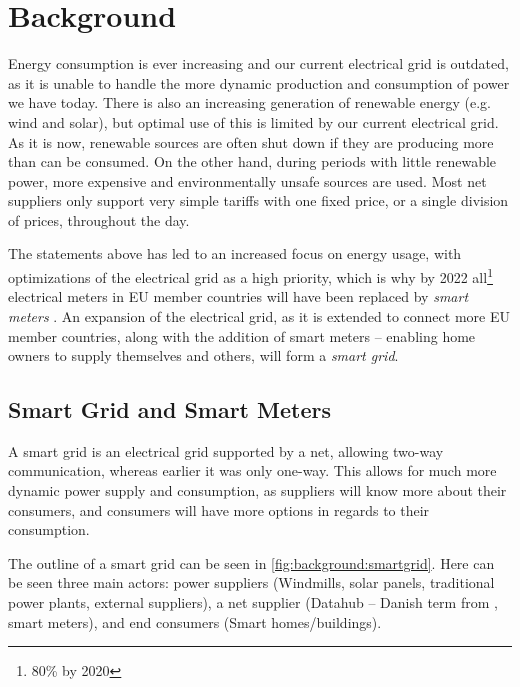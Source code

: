 \section{Background}
Energy consumption is ever increasing and our current electrical grid is outdated, as it is unable to handle the more dynamic production and consumption of power we have today.
There is also an increasing generation of renewable energy (e.g. wind and solar), but optimal use of this is limited by our current electrical grid.
As it is now, renewable sources are often shut down if they are producing more than can be consumed.
On the other hand, during periods with little renewable power, more expensive and environmentally unsafe sources are used.
Most net suppliers only support very simple tariffs with one fixed price, or a single division of prices, throughout the day.

The statements above has led to an increased focus on energy usage, with optimizations of the electrical grid as a high priority, which is why by 2022 all\footnote{80\% by 2020} electrical meters in EU member countries will have been replaced by \textit{smart meters} \cite{smart_meter_survey} \cite{directive_2009_72_EC}.
An expansion of the electrical grid, as it is extended to connect more EU member countries, along with the addition of smart meters -- enabling home owners to supply themselves and others, will form a \textit{smart grid}.

\subsection{Smart Grid and Smart Meters}
A smart grid is an electrical grid supported by a net, allowing two-way communication, whereas earlier it was only one-way.
This allows for much more dynamic power supply and consumption, as suppliers will know more about their consumers, and consumers will have more options in regards to their consumption.

The outline of a smart grid can be seen in \cref{fig:background:smartgrid}.
Here can be seen three main actors: power suppliers (Windmills, solar panels, traditional power plants, external suppliers), a net supplier (Datahub -- Danish term from \cite{LOV_nr_575_af_18-06-2012}, smart meters), and end consumers (Smart homes/buildings).

